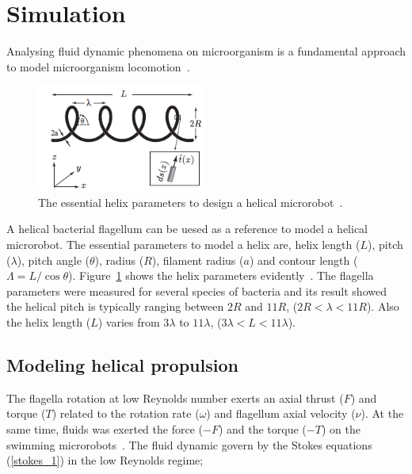 \documentclass[12pt,a4paper,titlepage]{report}
\begin{document}




\section{Simulation}

Analysing fluid dynamic phenomena on microorganism is a fundamental approach to model microorganism
 locomotion~\citep{smith2009boundary}.


\begin{figure}
  \begin{center}
    \includegraphics[width=0.5\textwidth]{parameters}
  \caption{The essential helix parameters to design a helical microrobot~\citep{rodenborn2013propulsion}.}
  \label{parameters}
\end{center}
\end{figure}

A helical bacterial flagellum can be uesed as a reference to model a helical microrobot. The 
essential parameters to model a helix are, helix length ($L$), pitch ($\lambda$), pitch angle ($\theta$), 
radius ($R$), filament radius ($a$) and contour length ($\Lambda = L/ \cos \theta$). Figure~\ref{parameters} shows
the helix parameters evidently~\citep{rodenborn2013propulsion}. The flagella parameters were measured for
 several species of bacteria and its result showed the helical pitch is typically ranging between $2R$ and
$11R$, ($2R < \lambda < 11R$). Also the helix length ($L$) varies from $3\lambda$ to $11\lambda$, 
($3\lambda < L < 11\lambda$).


\subsection{Modeling helical propulsion}\label{maths}
The flagella rotation at low Reynolds number exerts an axial thrust ($F$) and torque ($T$) related to the
rotation rate ($\omega$) and flagellum axial velocity ($\nu$). At the same time, fluids was exerted the force
 ($-F$) and the torque ($-T$) on the swimming microrobots~\citep{purcell1997efficiency}. The fluid dynamic 
govern by the Stokes equations (\ref{stokes_1}) in the low Reynolds regime;
\end{document}
